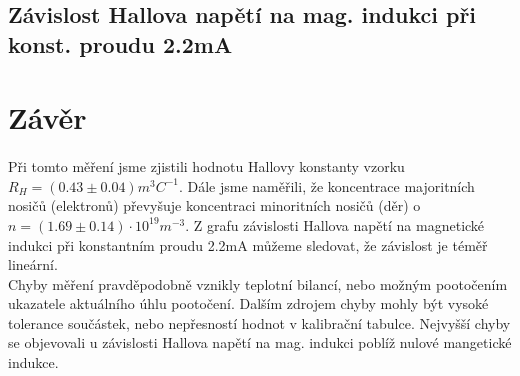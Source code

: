 \documentclass{praktikum}
\begin{document}
\subsection{Závislost Hallova napětí na mag. indukci při konst. proudu 2.2mA}


\section{Závěr}
\paragraph{}
Při tomto měření jsme zjistili hodnotu Hallovy konstanty vzorku $R_H = (0.43 \pm 0.04) m^3C^{-1}$. Dále jsme naměřili, že koncentrace majoritních nosičů (elektronů) převyšuje koncentraci minoritních nosičů (děr) o $n = ( 1.69\pm 0.14) \cdot 10 ^ {19} m ^ {-3}$. Z grafu závislosti Hallova napětí na magnetické indukci při konstantním proudu 2.2mA můžeme sledovat, že závislost je téměř lineární. \\
\indent Chyby měření pravděpodobně vznikly teplotní bilancí, nebo možným pootočením ukazatele aktuálního úhlu pootočení. Dalším zdrojem chyby mohly být vysoké tolerance součástek, nebo nepřesností hodnot v kalibrační tabulce. Nejvyšší chyby se objevovali u závislosti Hallova napětí na mag. indukci poblíž nulové mangetické indukce.
\end{document}

